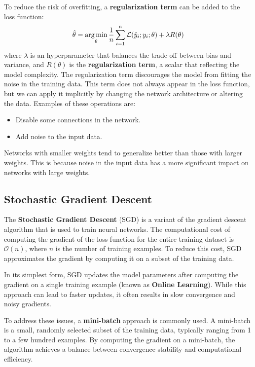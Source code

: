 To reduce the risk of overfitting, a \textbf{regularization term} can be added
to the loss function:
\begin{equation}
    \hat{\theta} = \operatorname*{arg\,min}_{\theta} \frac{1}{n} \sum_{i=1}^n \mathcal{L}(\hat{y}_i; y_i; \theta)
    + \lambda R(\theta)
\end{equation}
where $\lambda$ is an hyperparameter that balances the trade-off between bias and
variance, and $R(\theta)$ is the \textbf{regularization term}, a scalar that
reflecting the model complexity. The regularization term discourages the model from
fitting the noise in the training data. This term does not always appear in the
loss function, but we can apply it implicitly by changing the network architecture
or altering the data. Examples of these operations are:
\begin{itemize}
    \item Disable some connections in the network.
    \item Add noise to the input data.
\end{itemize}
\begin{note}
    Networks with smaller weights tend to generalize better than those with larger
    weights. This is because noise in the input data has a more significant impact
    on networks with large weights.
\end{note}
\subsection{Stochastic Gradient Descent}
The \textbf{Stochastic Gradient Descent} (SGD) is a variant of the gradient descent
algorithm that is used to train neural networks. The computational cost of computing
the gradient of the loss function for the entire training dataset is $\mathcal{O}(n)$,
where $n$ is the number of training examples. To reduce this cost, SGD approximates
the gradient by computing it on a subset of the training data.

In its simplest form, SGD updates the model parameters after computing the gradient
on a single training example (known as \textbf{Online Learning}). While this approach
can lead to faster updates, it often results in slow convergence and noisy gradients.

To address these issues, a \textbf{mini-batch} approach is commonly used. A mini-batch
is a small, randomly selected subset of the training data, typically ranging from
1 to a few hundred examples. By computing the gradient on a mini-batch, the
algorithm achieves a balance between convergence stability and computational
efficiency.

